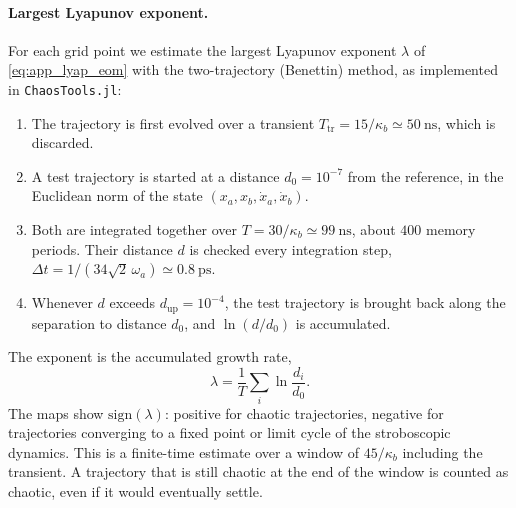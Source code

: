 \documentclass[aps,prx,reprint,floatfix,amsmath,amssymb,longbibliography]{revtex4-2}
\begin{document}
\paragraph*{Largest Lyapunov exponent.}
For each grid point we estimate the largest Lyapunov exponent $\lambda$ of \cref{eq:app_lyap_eom} with the two-trajectory (Benettin) method, as implemented in \texttt{ChaosTools.jl}:
\begin{enumerate}
    \item The trajectory is first evolved over a transient $T_\text{tr} = 15/\kappa_b \simeq 50~\mathrm{ns}$, which is discarded.
    \item A test trajectory is started at a distance $d_0 = 10^{-7}$ from the reference, in the Euclidean norm of the state $(x_a, x_b, \dot x_a, \dot x_b)$.
    \item Both are integrated together over $T = 30/\kappa_b \simeq 99~\mathrm{ns}$, about $400$ memory periods. Their distance $d$ is checked every integration step, $\Delta t = 1/(34\sqrt2\,\omega_a) \simeq 0.8~\mathrm{ps}$.
    \item Whenever $d$ exceeds $d_\text{up} = 10^{-4}$, the test trajectory is brought back along the separation to distance $d_0$, and $\ln(d/d_0)$ is accumulated.
\end{enumerate}
The exponent is the accumulated growth rate,
\begin{equation}
    \lambda = \frac{1}{T}\sum_i \ln\frac{d_i}{d_0}.
\end{equation}
The maps show $\mathrm{sign}(\lambda)$: positive for chaotic trajectories, negative for trajectories converging to a fixed point or limit cycle of the stroboscopic dynamics. This is a finite-time estimate over a window of $45/\kappa_b$ including the transient. A trajectory that is still chaotic at the end of the window is counted as chaotic, even if it would eventually settle.
\end{document}
